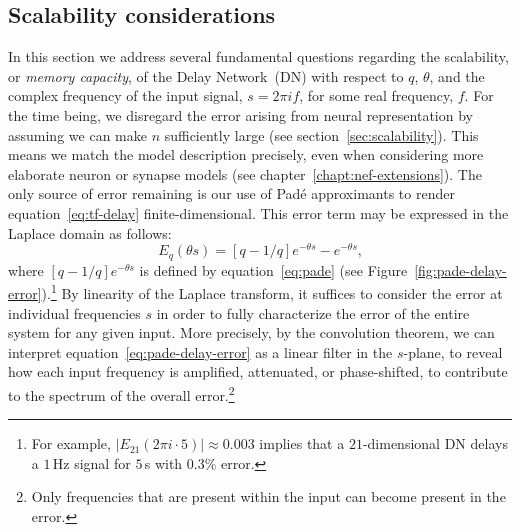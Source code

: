 
\subsection{Scalability considerations}
\label{sec:delay-scalability}


In this section we address several fundamental questions regarding the scalability, or \emph{memory capacity}, of the Delay Network~(DN) with respect to $q$, $\theta$, and the complex frequency of the input signal, $s = 2 \pi i f$, for some real frequency, $f$.
For the time being, we disregard the error arising from neural representation by assuming we can make $n$ sufficiently large (see section~\ref{sec:scalability}).
This means we match the model description precisely, even when considering more elaborate neuron or synapse models (see chapter~\ref{chapt:nef-extensions}).
The only source of error remaining is our use of Pad\'e approximants to render equation~\ref{eq:tf-delay} finite-dimensional.
This error term may be expressed in the Laplace domain as follows:
\begin{equation} \label{eq:pade-delay-error}
E_q(\theta s) = [q-1/q]e^{-\theta s} - e^{-\theta s} \text{,}
\end{equation}
where $[q-1/q]e^{-\theta s}$ is defined by equation~\ref{eq:pade} (see Figure~\ref{fig:pade-delay-error}).\footnote{%
For example, $|E_{21}(2 \pi i \cdot 5)| \approx 0.003$ implies that a $21$-dimensional DN delays a $1$\,Hz signal for $5$\,s with $0.3\%$ error.}
By linearity of the Laplace transform, it suffices to consider the error at individual frequencies $s$ in order to fully characterize the error of the entire system for any given input.
More precisely, by the convolution theorem, we can interpret equation~\ref{eq:pade-delay-error} as a linear filter in the $s$-plane, to reveal how each input frequency is amplified, attenuated, or phase-shifted, to contribute to the spectrum of the overall error.\footnote{%
Only frequencies that are present within the input can become present in the error.}

